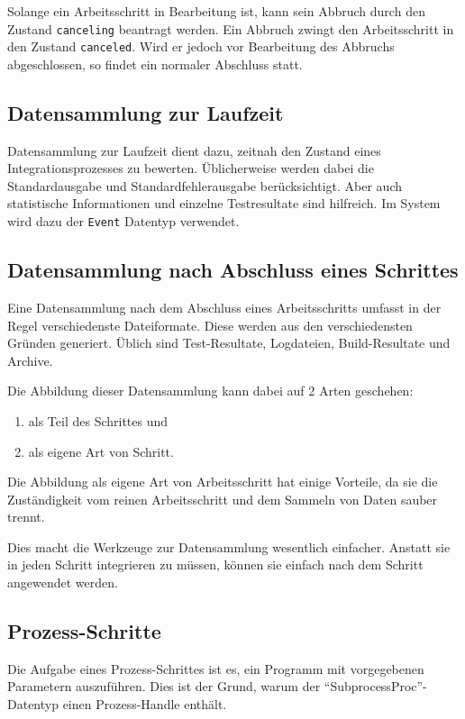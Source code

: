 Solange ein Arbeitsschritt in Bearbeitung ist, kann sein Abbruch
durch den Zustand \verb|canceling| beantragt werden.
Ein Abbruch zwingt den Arbeitsschritt in den Zustand \verb|canceled|.
Wird er jedoch vor Bearbeitung des Abbruchs abgeschlossen,
so findet ein normaler Abschluss statt.

\subsection{Datensammlung zur Laufzeit}

Datensammlung zur Laufzeit dient dazu, zeitnah den Zustand eines Integrationsprozesses zu bewerten.
Üblicherweise werden dabei die Standardausgabe und Standardfehlerausgabe berücksichtigt. Aber auch statistische Informationen und einzelne Testresultate sind hilfreich. Im System wird dazu der \verb|Event| Datentyp verwendet.

\subsection{Datensammlung nach Abschluss eines Schrittes}

Eine Datensammlung nach dem Abschluss eines Arbeitsschritts
umfasst in der Regel verschiedenste Dateiformate.
Diese werden aus den verschiedensten Gründen generiert.
Üblich sind Test-Resultate, Logdateien, Build-Resultate und Archive.

Die Abbildung dieser Datensammlung kann dabei auf 2 Arten geschehen:

\begin{enumerate}
    \item als Teil des Schrittes und
    \item als eigene Art von Schritt.
\end{enumerate}

Die Abbildung als eigene Art von Arbeitsschritt hat einige Vorteile,
da sie die Zuständigkeit vom reinen Arbeitsschritt und dem Sammeln von Daten sauber trennt.

Dies macht die Werkzeuge zur Datensammlung wesentlich einfacher.
Anstatt sie in jeden Schritt integrieren zu müssen,
können sie einfach nach dem Schritt angewendet werden.

\subsection{Prozess-Schritte}

Die Aufgabe eines Prozess-Schrittes ist es,
ein Programm mit vorgegebenen Parametern auszuführen.
Dies ist der Grund, warum der ``SubprocessProc''-Datentyp einen
Prozess-Handle enthält.

